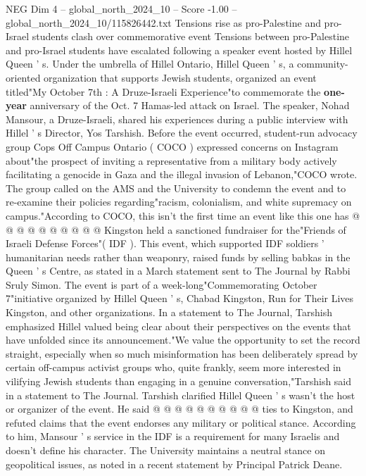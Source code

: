 \begin{textsample}{NEG Dim 4 – global\_north\_2024\_10 – Score -1.00 – global\_north\_2024\_10/115826442.txt}  \label{ex:f4_neg_052}
Tensions rise as pro-Palestine and pro-Israel students clash over commemorative event Tensions between pro-Palestine and pro-Israel students have escalated following a speaker event hosted by Hillel Queen ' s.
Under the umbrella of Hillel Ontario, Hillel Queen ' s, a community-oriented organization that supports Jewish students, organized an event titled"My October 7th : A Druze-Israeli Experience"to commemorate the \textbf{one-year} anniversary of the Oct. 7 Hamas-led attack on Israel.
The speaker, Nohad Mansour, a Druze-Israeli, shared his experiences during a public interview with Hillel ' s Director, Yos Tarshish.
Before the event occurred, student-run advocacy group Cops Off Campus Ontario ( COCO ) expressed concerns on Instagram about"the prospect of inviting a representative from a military body actively facilitating a genocide in Gaza and the illegal invasion of Lebanon,"COCO wrote.
The group called on the AMS and the University to condemn the event and to re-examine their policies regarding"racism, colonialism, and white supremacy on campus."According to COCO, this isn't the first time an event like this one has @ @ @ @ @ @ @ @ @ @ Kingston held a sanctioned fundraiser for the"Friends of Israeli Defense Forces"( IDF ).
This event, which supported IDF soldiers ' humanitarian needs rather than weaponry, raised funds by selling babkas in the Queen ' s Centre, as stated in a March statement sent to The Journal by Rabbi Sruly Simon.
The event is part of a week-long"Commemorating October 7"initiative organized by Hillel Queen ' s, Chabad Kingston, Run for Their Lives Kingston, and other organizations.
In a statement to The Journal, Tarshish emphasized Hillel valued being clear about their perspectives on the events that have unfolded since its announcement."We value the opportunity to set the record straight, especially when so much misinformation has been deliberately spread by certain off-campus activist groups who, quite frankly, seem more interested in vilifying Jewish students than engaging in a genuine conversation,"Tarshish said in a statement to The Journal.
Tarshish clarified Hillel Queen ' s wasn't the host or organizer of the event.
He said @ @ @ @ @ @ @ @ @ @ ties to Kingston, and refuted claims that the event endorses any military or political stance.
According to him, Mansour ' s service in the IDF is a requirement for many Israelis and doesn't define his character.
The University maintains a neutral stance on geopolitical issues, as noted in a recent statement by Principal Patrick Deane.

\end{textsample}
